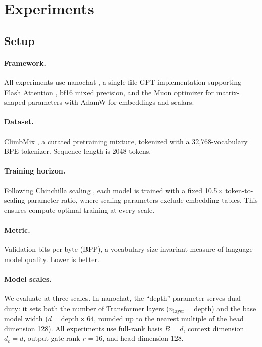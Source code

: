 \documentclass[11pt]{article}
\begin{document}
\section{Experiments}
\label{sec:experiments}

\subsection{Setup}

\paragraph{Framework.} All experiments use nanochat \citep{karpathy2025nanochat}, a single-file GPT implementation supporting Flash Attention \citep{dao2022flashattention}, bf16 mixed precision, and the Muon optimizer \citep{jordan2024muon} for matrix-shaped parameters with AdamW for embeddings and scalars.

\paragraph{Dataset.} ClimbMix \citep{nvidia2024climbmix}, a curated pretraining mixture, tokenized with a 32,768-vocabulary BPE tokenizer. Sequence length is 2048 tokens.

\paragraph{Training horizon.} Following Chinchilla scaling \citep{hoffmann2022training}, each model is trained with a fixed 10.5$\times$ token-to-scaling-parameter ratio, where scaling parameters exclude embedding tables. This ensures compute-optimal training at every scale.

\paragraph{Metric.} Validation bits-per-byte (BPP), a vocabulary-size-invariant measure of language model quality. Lower is better.

\paragraph{Model scales.} We evaluate at three scales. In nanochat, the ``depth'' parameter serves dual duty: it sets both the number of Transformer layers ($n_\text{layer} = \text{depth}$) and the base model width ($d = \text{depth} \times 64$, rounded up to the nearest multiple of the head dimension 128). All experiments use full-rank basis $B = d$, context dimension $d_c = d$, output gate rank $r = 16$, and head dimension 128.
\end{document}
